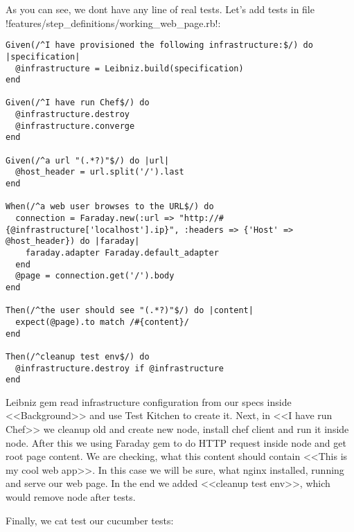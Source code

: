 As you can see, we dont have any line of real tests. Let's add tests in file \inline!features/step_definitions/working_web_page.rb!:

\begin{lstlisting}[label=lst:testing-cucumber-spec6]
Given(/^I have provisioned the following infrastructure:$/) do |specification|
  @infrastructure = Leibniz.build(specification)
end

Given(/^I have run Chef$/) do
  @infrastructure.destroy
  @infrastructure.converge
end

Given(/^a url "(.*?)"$/) do |url|
  @host_header = url.split('/').last
end

When(/^a web user browses to the URL$/) do
  connection = Faraday.new(:url => "http://#{@infrastructure['localhost'].ip}", :headers => {'Host' => @host_header}) do |faraday|
    faraday.adapter Faraday.default_adapter
  end
  @page = connection.get('/').body
end

Then(/^the user should see "(.*?)"$/) do |content|
  expect(@page).to match /#{content}/
end

Then(/^cleanup test env$/) do
  @infrastructure.destroy if @infrastructure
end
\end{lstlisting}

Leibniz gem read infrastructure configuration from our specs inside <<Background>> and use Test Kitchen to create it. Next, in <<I have run Chef>> we cleanup old and create new node, install chef client and run it inside node. After this we using Faraday gem to do HTTP request inside node and get root page content. We are checking, what this content should contain <<This is my cool web app>>. In this case we will be sure, what nginx installed, running and serve our web page. In the end we added <<cleanup test env>>, which would remove node after tests.

Finally, we cat test our cucumber tests:

